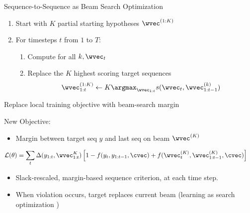 \begin{frame}{Sequence-to-Sequence as Beam Search Optimization}
  \begin{enumerate}
  \item Start with $K$ partial starting hypotheses $\wvec^{(1:K)}$
  \item For timesteps $t$ from  $1$ to $T$:
   \begin{enumerate}
   \item Compute for all $k, \wvec_{t}$
   \item Replace the  $K$ highest scoring target sequences
     \[\wvec_{1:t}^{(1:K)} \gets K\argmax_{\wvec_{1:t}} s(\wvec_t, \wvec_{1:t-1}^{(k)})\]  
   \end{enumerate}
  \end{enumerate}

\end{frame}


\begin{frame}{ Replace local training objective with beam-search margin}

  New Objective: 
  \begin{itemize}

  \item Margin between target seq $y$ and last seq on beam $\wvec^{(K)}$  
  \end{itemize}
\begin{align*}
 \mathcal{L}&(\theta) = \sum_{t} \Delta(y_{1:t}, \wvec_{1:t}^{K}) \left[1 - f(y_t, y_{1:t-1}, \cvec) +  f(\wvec_t^{(K)}, \wvec_{1:t-1}^{(K)}, \cvec) \right] 
\end{align*}

\begin{itemize}
  \item Slack-rescaled, margin-based sequence criterion, at each time step.  
\item When violation occurs, target replaces current beam (learning as search optimization \cite{daume05learning})
\end{itemize}

\end{frame}

